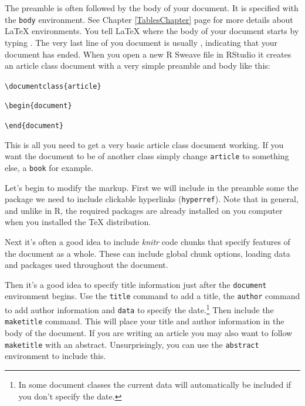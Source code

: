 The preamble is often followed by the body of your document. It is specified with the \texttt{body} environment. See Chapter \ref{TablesChapter} page \pageref{LaTeXEnviron} for more details about LaTeX environments. You tell LaTeX where the body of your document starts by typing \verb||. The very last line of you document is usually \verb||, indicating that your document has ended. When you open a new R Sweave file in RStudio it creates an article class document with a very simple preamble and body like this:

\begin{knitrout}
\color{fgcolor}\begin{kframe}
\begin{alltt}
\textbackslash{}documentclass\{article\}

\textbackslash{}begin\{document\}




\textbackslash{}end\{document\}
\end{alltt}
\end{kframe}
\end{knitrout}


\noindent This is all you need to get a very basic article class document working. If you want the document to be of another class simply change \texttt{article} to something else, a \texttt{book} for example.

Let's begin to modify the markup. First we will include in the preamble some the package we need to include clickable hyperlinks (\texttt{hyperref}). Note that in general, and unlike in R, the required packages are already installed on you computer when you installed the TeX distribution.

Next it's often a good idea to include \emph{knitr} code chunks that specify features of the document as a whole. These can include global chunk options, loading data and packages used throughout the document.

Then it's a good idea to specify title information just after the \texttt{document} environment begins. Use the \texttt{title} command to add a title, the \texttt{author} command to add author information and \texttt{data} to specify the date.\footnote{In some document classes the current data will automatically be included if you don't specify the date.} Then include the \texttt{maketitle} command. This will place your title and author information in the body of the document. If you are writing an article you may also want to follow \texttt{maketitle} with an abstract. Unsurprisingly, you can use the \texttt{abstract} environment to include this.

